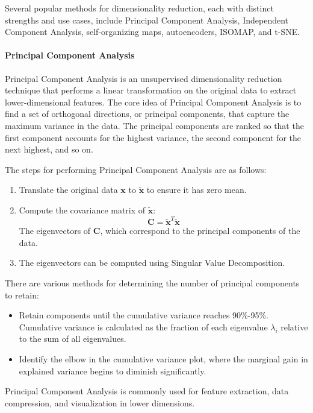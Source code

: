 Several popular methods for dimensionality reduction, each with distinct strengths and use cases, include Principal Component Analysis, Independent Component Analysis, self-organizing maps, autoencoders, ISOMAP, and t-SNE.

\paragraph*{Principal Component Analysis}
Principal Component Analysis is an unsupervised dimensionality reduction technique that performs a linear transformation on the original data to extract lower-dimensional features.
The core idea of Principal Component Analysis is to find a set of orthogonal directions, or principal components, that capture the maximum variance in the data. 
The principal components are ranked so that the first component accounts for the highest variance, the second component for the next highest, and so on.

The steps for performing Principal Component Analysis are as follows:
\begin{enumerate}
    \item Translate the original data $\mathbf{x}$ to $\tilde{\mathbf{x}}$ to ensure it has zero mean.
    \item Compute the covariance matrix of $\tilde{\mathbf{x}}$: 
        \[\mathbf{C}=\tilde{\mathbf{x}}^T\tilde{\mathbf{x}}\]
        The eigenvectors of $\mathbf{C}$, which correspond to the principal components of the data.
    \item The eigenvectors can be computed using Singular Value Decomposition. 
\end{enumerate}
There are various methods for determining the number of principal components to retain:
\begin{itemize} 
    \item Retain components until the cumulative variance reaches 90\%-95\%. 
        Cumulative variance is calculated as the fraction of each eigenvalue $\lambda_i$ relative to the sum of all eigenvalues. 
    \item Identify the elbow in the cumulative variance plot, where the marginal gain in explained variance begins to diminish significantly. 
\end{itemize}
Principal Component Analysis is commonly used for feature extraction, data compression, and visualization in lower dimensions.

